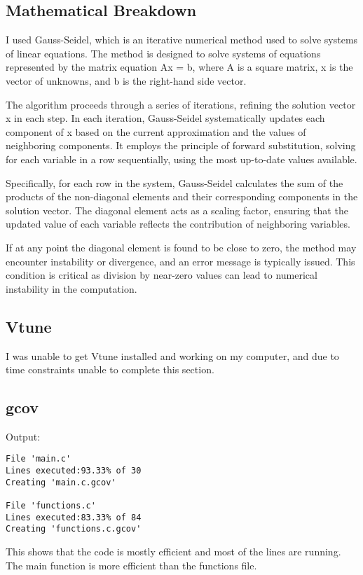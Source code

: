 \documentclass[12pt]{article}
\begin{document}
\subsection{Mathematical Breakdown}
I used Gauss-Seidel, which is an iterative numerical method used to solve systems of linear equations. The method is designed to solve systems of equations represented by the matrix equation Ax = b, where A is a square matrix, x is the vector of unknowns, and b is the right-hand side vector.

The algorithm proceeds through a series of iterations, refining the solution vector x in each step. In each iteration, Gauss-Seidel systematically updates each component of x based on the current approximation and the values of neighboring components. It employs the principle of forward substitution, solving for each variable in a row sequentially, using the most up-to-date values available.

Specifically, for each row in the system, Gauss-Seidel calculates the sum of the products of the non-diagonal elements and their corresponding components in the solution vector. The diagonal element acts as a scaling factor, ensuring that the updated value of each variable reflects the contribution of neighboring variables.

If at any point the diagonal element is found to be close to zero, the method may encounter instability or divergence, and an error message is typically issued. This condition is critical as division by near-zero values can lead to numerical instability in the computation.

\subsection{Vtune}
I was unable to get Vtune installed and working on my computer, and due to time constraints unable to complete this section.

\subsection{gcov}
Output:
\begin{lstlisting}
File 'main.c'
Lines executed:93.33% of 30
Creating 'main.c.gcov'

File 'functions.c'
Lines executed:83.33% of 84
Creating 'functions.c.gcov'
\end{lstlisting}

This shows that the code is mostly efficient and most of the lines are running. The main function is more efficient than the functions file.
\end{document}
